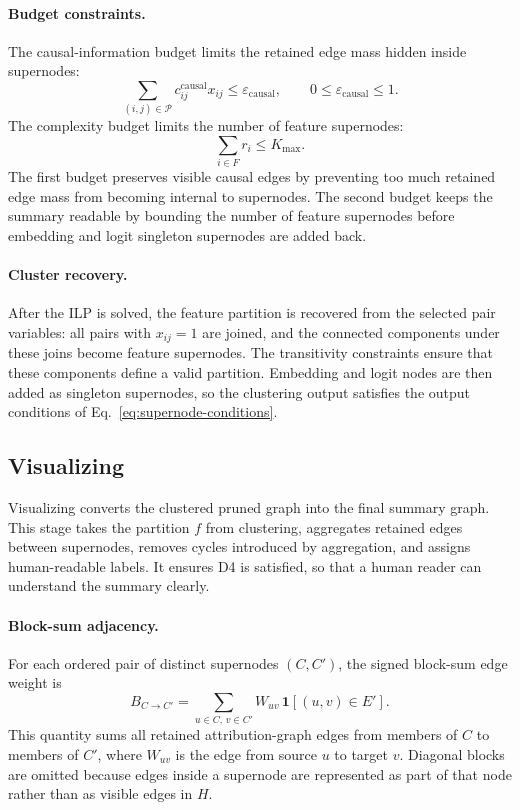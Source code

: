 \documentclass[../main.tex]{subfiles}
\begin{document}
\paragraph{Budget constraints.}
The causal-information budget limits the retained edge mass hidden inside
supernodes:
\begin{equation}
\sum_{(i,j)\in\mathcal{P}}
c^{\text{causal}}_{ij}x_{ij}
\le
\varepsilon_{\text{causal}},
\qquad
0 \le \varepsilon_{\text{causal}} \le 1.
\label{eq:causal-budget}
\end{equation}
The complexity budget limits the number of feature supernodes:
\begin{equation}
\sum_{i\in F} r_i \le K_{\max}.
\label{eq:cluster-budget}
\end{equation}
The first budget preserves visible causal edges by preventing too much retained
edge mass from becoming internal to supernodes. The second budget keeps the
summary readable by bounding the number of feature supernodes before embedding and
logit singleton supernodes are added back.

\paragraph{Cluster recovery.}
After the ILP is solved, the feature partition is recovered from the selected
pair variables: all pairs with $x_{ij}=1$ are joined, and the connected components
under these joins become feature supernodes. The transitivity constraints ensure
that these components define a valid partition. Embedding and logit nodes are then
added as singleton supernodes, so the clustering output satisfies the output
conditions of Eq.~\eqref{eq:supernode-conditions}.

\subsection{Visualizing}
\label{sec:stage3}

Visualizing converts the clustered pruned graph into the final summary graph.
This stage takes the partition $f$ from clustering, aggregates retained edges
between supernodes, removes cycles introduced by aggregation, and assigns
human-readable labels. It ensures D4 is satisfied, so that a human reader can understand the summary clearly.

\paragraph{Block-sum adjacency.}
For each ordered pair of distinct supernodes $(C,C')$, the signed block-sum edge
weight is
\begin{equation}
B_{C \to C'} =
\sum_{u \in C,\, v \in C'} W_{uv}\,\mathbf{1}[(u,v) \in E'].
\label{eq:block-sum}
\end{equation}
This quantity sums all retained attribution-graph edges from members of $C$ to
members of $C'$, where $W_{uv}$ is the edge from source $u$ to target $v$.
Diagonal blocks are omitted because edges inside a
supernode are represented as part of that node rather than as visible edges in
$H$.
\end{document}
